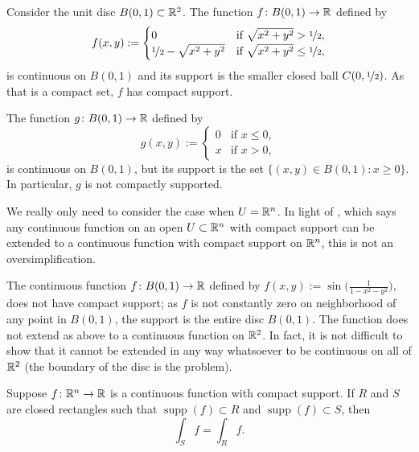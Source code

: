 \begin{example}
Consider the unit disc $B(0,1) \subset {\mathbb{R}}^2$.
The function $f \colon B(0,1) \to {\mathbb{R}}$ defined by
\begin{equation*}
f(x,y) :=
\begin{cases}
0                                & \text{if } \sqrt{x^2+y^2} > \nicefrac{1}{2}, \\
\nicefrac{1}{2} - \sqrt{x^2+y^2} & \text{if } \sqrt{x^2+y^2} \leq \nicefrac{1}{2},
\end{cases}
\end{equation*}
is continuous on $B(0,1)$ and its support is the smaller closed ball
$C(0,\nicefrac{1}{2})$.  As that is a compact set, $f$ has compact support.

The function $g \colon B(0,1) \to {\mathbb{R}}$ defined by
\begin{equation*}
g(x,y) :=
\begin{cases}
0 & \text{if } x \leq 0, \\
x & \text{if } x > 0,
\end{cases}
\end{equation*}
is continuous on $B(0,1)$, but its support is the set
$\bigl\{ (x,y) \in B(0,1) : x \geq 0 \bigr\}$.  In particular, $g$ is not compactly
supported.
\end{example}

We really only need to consider the case when $U={\mathbb{R}}^n$.  In light of
, which says any continuous
function on an open $U \subset {\mathbb{R}}^n$ with compact support can be extended to a
continuous function with compact support on ${\mathbb{R}}^n$,
this is not an oversimplification.

\begin{example}
The continuous function $f \colon B(0,1) \to {\mathbb{R}}$ defined by $f(x,y) :=
\sin\bigl(\frac{1}{1-x^2-y^2}\bigr)$, does not have compact support; as
$f$ is not constantly zero on neighborhood of any point in $B(0,1)$,
the support is the entire disc $B(0,1)$.  The function 
does not extend as above to a continuous function on ${\mathbb{R}}^2$.  In fact, it is not
difficult to show that it cannot be extended in any way whatsoever to be
continuous on all of ${\mathbb{R}}^2$ (the boundary of the disc is the problem).
\end{example}

\begin{prop} \label{mv:prop:rectanglessupp}
Suppose $f \colon {\mathbb{R}}^n \to {\mathbb{R}}$ is a continuous function with compact support.
If $R$ and $S$ are closed rectangles such that
$\operatorname{supp}(f) \subset R$
and
$\operatorname{supp}(f) \subset S$, then
\begin{equation*}
\int_S f = \int_R f .
\end{equation*}
\end{prop}


